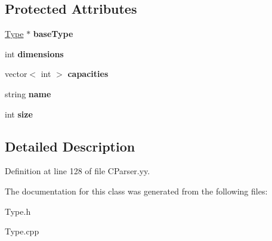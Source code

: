 \subsection*{Protected Attributes}
\begin{DoxyCompactItemize}
\item 
\hypertarget{classArrayType_a6ba43f71fd7a4b36cafa6e681a73fdae}{\hyperlink{classType}{Type} $\ast$ {\bfseries base\-Type}}\label{classArrayType_a6ba43f71fd7a4b36cafa6e681a73fdae}

\item 
\hypertarget{classArrayType_a892992ea07fd2f97b0733de0048bf8a4}{int {\bfseries dimensions}}\label{classArrayType_a892992ea07fd2f97b0733de0048bf8a4}

\item 
\hypertarget{classArrayType_aac65483b591d3ab519bf489f68c9e7f7}{vector$<$ int $>$ {\bfseries capacities}}\label{classArrayType_aac65483b591d3ab519bf489f68c9e7f7}

\item 
\hypertarget{classType_ad7eeefba3dfcecbdaa98d46aaa84e389}{string {\bfseries name}}\label{classType_ad7eeefba3dfcecbdaa98d46aaa84e389}

\item 
\hypertarget{classType_a871302dc63ac1a37c0b6a225cf82048d}{int {\bfseries size}}\label{classType_a871302dc63ac1a37c0b6a225cf82048d}

\end{DoxyCompactItemize}


\subsection{Detailed Description}


Definition at line 128 of file C\-Parser.\-yy.



The documentation for this class was generated from the following files\-:\begin{DoxyCompactItemize}
\item 
Type.\-h\item 
Type.\-cpp\end{DoxyCompactItemize}
